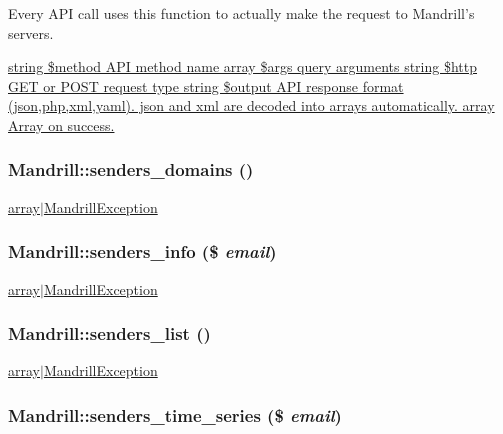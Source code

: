 Every API call uses this function to actually make the request to Mandrill's servers.

\hyperlink{}{string \$method API method name  array \$args query arguments  string \$http GET or POST request type  string \$output API response format (json,php,xml,yaml). json and xml are decoded into arrays automatically.   array Array on success. }\hypertarget{classMandrill_ae0111c45de1b73c2d4023ba22093533e}{
\subsubsection[{senders\_\-domains}]{\setlength{\rightskip}{0pt plus 5cm}Mandrill::senders\_\-domains ()}}
\label{classMandrill_ae0111c45de1b73c2d4023ba22093533e}
\hyperlink{}{array$|$MandrillException }\hypertarget{classMandrill_a89e20ca0f9da8a3a32d46c59e4b2d49a}{
\subsubsection[{senders\_\-info}]{\setlength{\rightskip}{0pt plus 5cm}Mandrill::senders\_\-info (\$ {\em email})}}
\label{classMandrill_a89e20ca0f9da8a3a32d46c59e4b2d49a}
\hyperlink{}{array$|$MandrillException }\hypertarget{classMandrill_a1a5194485cd5eb38dff8b78ed9f0b8a0}{
\subsubsection[{senders\_\-list}]{\setlength{\rightskip}{0pt plus 5cm}Mandrill::senders\_\-list ()}}
\label{classMandrill_a1a5194485cd5eb38dff8b78ed9f0b8a0}
\hyperlink{}{array$|$MandrillException }\hypertarget{classMandrill_a06a09d53f06ab20095862543145f1587}{
\subsubsection[{senders\_\-time\_\-series}]{\setlength{\rightskip}{0pt plus 5cm}Mandrill::senders\_\-time\_\-series (\$ {\em email})}}
\label{classMandrill_a06a09d53f06ab20095862543145f1587}
